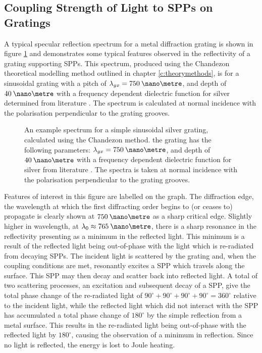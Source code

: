 \subsection{Coupling Strength of Light to SPPs on Gratings}
A typical specular reflection spectrum for a metal diffraction grating is shown in figure \ref{fig:examplespectra} and demonstrates some typical features observed in the reflectivity of a grating supporting SPPs. This spectrum, produced using the Chandezon theoretical modelling method outlined in chapter \ref{c:theorymethods}, is for a sinusoidal grating with a pitch of $\lambda_{gx}=750\:\nano\metre$, and depth of $40\:\nano\metre$ with a frequency dependent dielectric function for silver determined from literature \cite{Nash1996}. The spectrum is calculated at normal incidence with the polarisation perpendicular to the grating grooves.
\begin{figure}
\begin{center}

\end{center}
\caption[An example spectrum for a simple sinusoidal silver grating, calculated using the Chandezon method.]{An example spectrum for a simple sinusoidal silver grating, calculated using the Chandezon method. the grating has the following parameters: $\lambda_{gx}=750\:\nano\metre$, and depth of $40\:\nano\metre$ with a frequency dependent dielectric function for silver from literature \cite{Nash1996}. The spectra is taken at normal incidence with the polarisation perpendicular to the grating grooves.\label{fig:examplespectra}}
\end{figure}

Features of interest in this figure are labelled on the graph. The diffraction edge, the wavelength at which the first diffracting order begins to (or ceases to) propagate is clearly shown at $750\:\nano\metre$ as a sharp critical edge. Slightly higher in wavelength, at $\lambda_0\approx 765\:\nano\metre$, there is a sharp resonance in the reflectivity presenting as a minimum in the reflected light. This minimum is a result of the reflected light being out-of-phase with the light which is re-radiated from decaying SPPs.  The incident light is scattered by the grating and, when the coupling conditions are met, resonantly excites a SPP which travels along the surface. This SPP may then decay and scatter back into reflected light. A total of two scattering processes, an excitation and subsequent decay of a SPP, give the total phase change of the re-radiated light of $90^\circ+90^\circ+90^\circ+90^\circ=360^\circ$ relative to the incident light, while the reflected light which did not interact with the SPP has accumulated a total phase change of $180^\circ$ by the simple reflection from a metal surface. This results in the re-radiated light being out-of-phase with the reflected light by $180^\circ$, causing the observation of a minimum in reflection. Since no light is reflected, the energy is lost to Joule heating.

